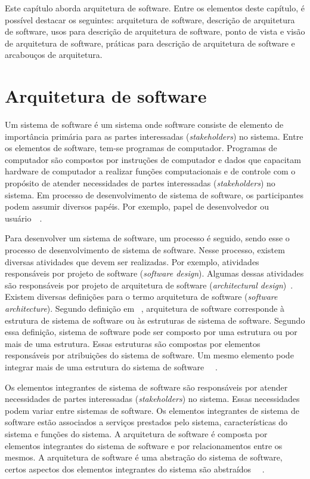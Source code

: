 Este capítulo aborda arquitetura de software. Entre os elementos deste capítulo, é possível destacar os seguintes: arquitetura de software, descrição de arquitetura de software, usos para  descrição de arquitetura de software, ponto de vista e visão de arquitetura de software, práticas para descrição de arquitetura de software e arcabouços de arquitetura.

\section{Arquitetura de software}

Um sistema de software é um sistema onde software consiste de elemento de importância primária para as partes interessadas (\emph{stakeholders}) no sistema. Entre os elementos de software, tem-se programas de computador. Programas de computador são compostos por instruções de computador e dados que capacitam hardware de computador a realizar funções computacionais e de controle com o propósito de atender necessidades de partes interessadas (\emph{stakeholders}) no sistema. Em processo de desenvolvimento de sistema de software, os participantes podem assumir diversos papéis. Por exemplo, papel de desenvolvedor ou usuário~\cite{Sevocab}~\cite{ISO_24765}.

Para desenvolver um sistema de software, um processo é seguido, sendo esse o processo de desenvolvimento de sistema de software. Nesse processo, existem diversas atividades que devem ser realizadas. Por exemplo, atividades responsáveis por projeto de software (\emph{software design}). Algumas dessas atividades  são responsáveis por projeto de arquitetura de software (\emph{architectural design})~\cite{Sommerville_2011_texbook}. Existem diversas definições para o termo arquitetura de software (\emph{software architecture}). Segundo definição em ~\cite{arq_01}, arquitetura de software corresponde à estrutura de sistema de software ou às estruturas de sistema de software. Segundo essa definição, sistema de software pode ser composto por uma estrutura ou por mais de uma estrutura. Essas estruturas são compostas por elementos responsáveis por atribuições do sistema de software. Um mesmo elemento pode integrar mais de uma estrutura do sistema de software ~\cite{arq_01}~\cite{Carnegie_textbook}.

Os elementos integrantes de sistema de software são responsáveis
por atender necessidades de partes interessadas (\emph{stakeholders}) no sistema. 
Essas necessidades podem variar entre sistemas de software. Os elementos integrantes de sistema de software estão associados a serviços prestados pelo sistema, características do sistema e funções do sistema. A arquitetura de software é composta por elementos integrantes do sistema de software e por relacionamentos entre os mesmos. A arquitetura de software é uma abstração do sistema de software, certos aspectos dos elementos integrantes do sistema são abstraídos ~\cite{arq_01}~\cite{Carnegie_textbook}.

